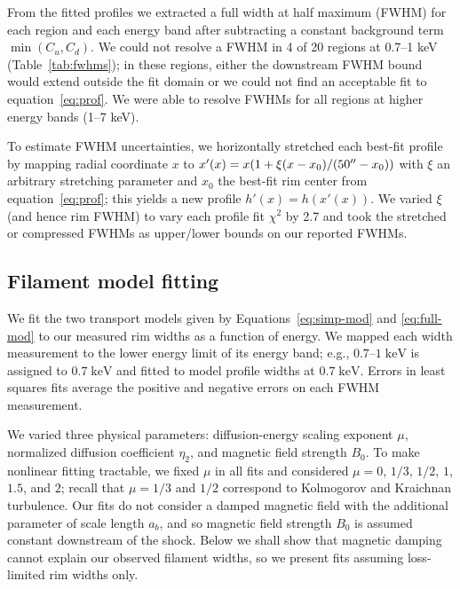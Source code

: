 \documentclass[iop, apj, numberedappendix, twocolappendix]{emulateapj}
\newcommand*{\mt}{\mathrm}
\newcommand*{\unit}[1]{\;\mt{#1}}  %
\begin{document}
From the fitted profiles we extracted a full width at half maximum (FWHM) for
each region and each energy band after subtracting a constant background term
$\min(C_u, C_d)$.  We could not resolve a FWHM in 4 of 20 regions at 0.7--1 keV
(Table~\ref{tab:fwhms}); in these regions, either the downstream FWHM bound
would extend outside the fit domain or we could not find an acceptable fit to
equation~\eqref{eq:prof}.  We were able to resolve FWHMs for all regions at
higher energy bands (1--7 keV).

To estimate FWHM uncertainties, we horizontally stretched each best-fit
profile by mapping radial coordinate $x$ to
$x'(x) = x (1 + \xi (x-x_0)/(50\mbox{$^{\prime\prime}$}-x_0))$ with $\xi$ an arbitrary stretching
parameter and $x_0$ the best-fit rim center from equation~\eqref{eq:prof};
this yields a new profile $h'(x) = h(x'(x))$.
We varied $\xi$ (and hence rim FWHM) to vary each profile fit $\chi^2$ by 2.7
and took the stretched or compressed FWHMs as upper/lower bounds on our
reported FWHMs.

\subsection{Filament model fitting}
\label{sec:fits}

We fit the two transport models given by Equations~\eqref{eq:simp-mod} and
\eqref{eq:full-mod} to our measured rim widths as a function of energy.
We mapped each width measurement to the lower energy limit of its energy band;
e.g., $0.7$--$1 \unit{keV}$ is assigned to $0.7 \unit{keV}$ and fitted to
model profile widths at $0.7 \unit{keV}$.  Errors in least squares fits
average the positive and negative errors on each FWHM measurement.

We varied three physical parameters: diffusion-energy scaling exponent $\mu$,
normalized diffusion coefficient $\eta_2$, and magnetic field strength $B_0$.
To make nonlinear fitting tractable, we fixed $\mu$ in all fits and considered
$\mu = 0$, $1/3$, $1/2$, $1$, $1.5$, and $2$; recall that $\mu = 1/3$ and $1/2$
correspond to Kolmogorov and Kraichnan turbulence.  Our fits do not consider
a damped magnetic field with the additional parameter of scale length $a_b$,
and so magnetic field strength $B_0$ is assumed constant downstream of the
shock.  Below we shall show that magnetic damping cannot explain our observed
filament widths, so we present fits assuming loss-limited rim widths only.
\end{document}
